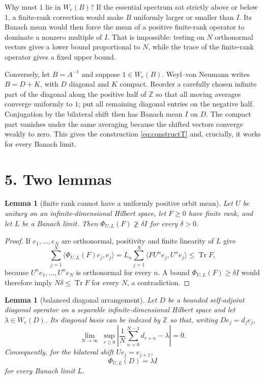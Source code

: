 \documentclass[11pt]{article}
\newtheorem{lemma}[theorem]{Lemma}
\newcommand{\We}{W_{\!e}}
\newcommand{\PhiUL}{\Phi_{U,L}}
\begin{document}
Why must $1$ lie in $\We(B)$?  If the essential spectrum sat strictly above or below $1$, a finite-rank correction would make $B$ uniformly larger or smaller than $I$.  Its Banach mean would then force the mean of a positive finite-rank operator to dominate a nonzero multiple of $I$.  That is impossible: testing on $N$ orthonormal vectors gives a lower bound proportional to $N$, while the trace of the finite-rank operator gives a fixed upper bound.

Conversely, let $B=A^{-1}$ and suppose $1\in\We(B)$.  Weyl--von Neumann writes $B=D+K$, with $D$ diagonal and $K$ compact.  Reorder a carefully chosen infinite part of the diagonal along the positive half of $\mathbb Z$ so that all moving averages converge uniformly to $1$; put all remaining diagonal entries on the negative half.  Conjugation by the bilateral shift then has Banach mean $I$ on $D$.  The compact part vanishes under the same averaging because the shifted vectors converge weakly to zero.  This gives the construction \eqref{eq:constructT} and, crucially, it works for every Banach limit.

\section*{5. Two lemmas}

\begin{lemma}[finite rank cannot have a uniformly positive orbit mean]\label{lem:finite-rank}
Let $U$ be unitary on an infinite-dimensional Hilbert space, let $F\geq0$ have finite rank, and let $L$ be a Banach limit.  Then $\PhiUL(F)\not\geq\delta I$ for every $\delta>0$.
\end{lemma}

\begin{proof}
If $e_1,\dots,e_N$ are orthonormal, positivity and finite linearity of $L$ give
\[
 \sum_{j=1}^N\langle\PhiUL(F)e_j,e_j\rangle
 =L_n\sum_{j=1}^N\langle FU^ne_j,U^ne_j\rangle
 \leq \operatorname{Tr}F,
\]
because $U^ne_1,\dots,U^ne_N$ is orthonormal for every $n$.  A bound $\PhiUL(F)\geq\delta I$ would therefore imply $N\delta\leq\operatorname{Tr}F$ for every $N$, a contradiction.
\end{proof}

\begin{lemma}[balanced diagonal arrangement]\label{lem:diagonal}
Let $D$ be a bounded self-adjoint diagonal operator on a separable infinite-dimensional Hilbert space and let $\lambda\in\We(D)$.  Its diagonal basis can be indexed by $\mathbb Z$ so that, writing $De_j=d_je_j$,
\begin{equation}\label{eq:almost}
 \lim_{N\to\infty}\ \sup_{r\geq0}
 \left|\frac1N\sum_{n=0}^{N-1}d_{r+n}-\lambda\right|=0.
\end{equation}
Consequently, for the bilateral shift $Ue_j=e_{j+1}$,
\begin{equation}\label{eq:PhiD}
 \PhiUL(D)=\lambda I
\end{equation}
for every Banach limit $L$.
\end{lemma}
\end{document}
